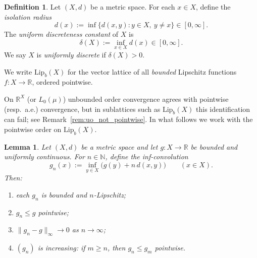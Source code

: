 \documentclass[11pt]{amsart}
\newtheorem{lemma}[theorem]{Lemma}
\theoremstyle{definition}
\newtheorem{definition}[theorem]{Definition}
\newcommand{\R}{\mathbb{R}}
\newcommand{\N}{\mathbb{N}}
\renewcommand{\le}{\leqslant}
\renewcommand{\ge}{\geqslant}
\begin{document}
\begin{definition}\label{def:sep-radius}
Let $(X,d)$ be a metric space. For each $x\in X$, define the \emph{isolation radius}
\[
d(x):=\inf\{d(x,y):y\in X,\ y\neq x\}\in[0,\infty].
\]
The \emph{uniform discreteness constant} of $X$ is
\[
\delta(X):=\inf_{x\in X} d(x)\in[0,\infty].
\]
We say $X$ is \emph{uniformly discrete} if $\delta(X)>0$.

\smallskip
We write $\mathrm{Lip}_b(X)$ for the vector lattice of all \emph{bounded}
Lipschitz functions $f:X\to\R$, ordered pointwise.
\end{definition}

On $\R^X$ (or $L_0(\mu)$) unbounded order convergence agrees with pointwise (resp.\ a.e.) convergence,
but in sublattices such as $\mathrm{Lip}_b(X)$ this identification can fail; see Remark~\ref{rem:uo_not_pointwise}.
In what follows we work with the pointwise order on $\mathrm{Lip}_b(X)$.

\begin{lemma}\label{lem:UC-approx-by-Lip}
Let $(X,d)$ be a metric space and let $g:X\to\R$ be bounded and uniformly continuous.
For $n\in\N$, define the \emph{inf-convolution}
\[
g_n(x):=\inf_{y\in X}\bigl(g(y)+n\,d(x,y)\bigr)\qquad(x\in X).
\]
Then:
\begin{enumerate}[\upshape(i)]
\item each $g_n$ is bounded and $n$-Lipschitz;
\item $g_n\le g$ pointwise;
\item $\|g_n-g\|_\infty\to0$ as $n\to\infty$;
\item $(g_n)$ is increasing: if $m\ge n$, then $g_n\le g_m$ pointwise.
\end{enumerate}
\end{lemma}
\end{document}
